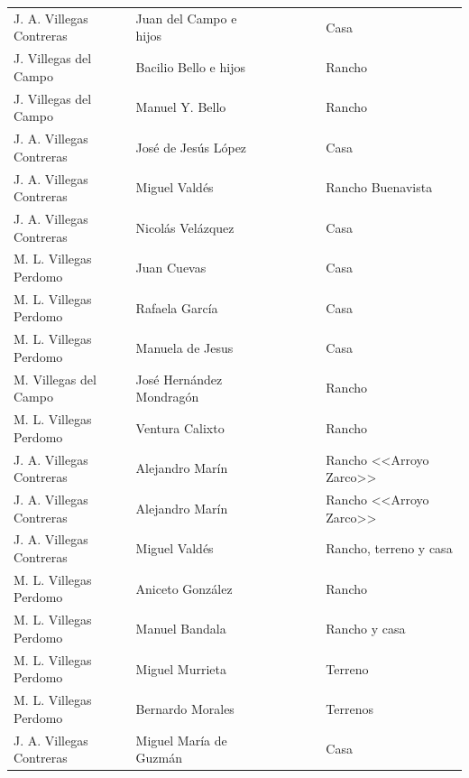 \documentclass[14pt,twoside,final]{extbook} %
\begin{document}
{\begin{longtable}[c]{@{}p{2.5cm}lrSrrl@{}}
J. A. Villegas Contreras & Juan del Campo e hijos &  &  &  &  & Casa \\
J. Villegas del Campo & Bacilio Bello e hijos &  &  & {} & {} & Rancho \\
J. Villegas del Campo & Manuel Y. Bello &  & {} & {} & {} & Rancho \\
J. A. Villegas Contreras & José de Jesús López &  & {} & {} & {} & Casa \\
J. A. Villegas Contreras & Miguel Valdés &  &  &  &  & Rancho Buenavista \\
J. A. Villegas Contreras & Nicolás Velázquez &  &  &  &  & Casa \\
M. L. Villegas Perdomo & Juan Cuevas &  & {} & {} & {} & Casa \\
M. L. Villegas Perdomo & Rafaela García &  & {} & {} & {} & Casa \\
M. L. Villegas Perdomo & Manuela de Jesus &  & {} & {} & {} & Casa \\
M. Villegas del Campo & José Hernández Mondragón &  & {} & {} & {} & Rancho \\
M. L. Villegas Perdomo & Ventura Calixto &  & {} & {} & {} & Rancho \\
J. A. Villegas Contreras & Alejandro Marín &  & {} &  &  & Rancho <<Arroyo Zarco>> \\
J. A. Villegas Contreras & Alejandro Marín &  &  &  &  & Rancho <<Arroyo Zarco>> \\
J. A. Villegas Contreras & Miguel Valdés &  & {} &  &  & Rancho, terreno y casa \\
M. L. Villegas Perdomo & Aniceto González &  &  & {} & {} & Rancho \\
M. L. Villegas Perdomo & Manuel Bandala &  & {} & {} & {} & Rancho y casa \\
M. L. Villegas Perdomo & Miguel Murrieta &  & {} & {} & {} & Terreno \\
M. L. Villegas Perdomo & Bernardo Morales &  & {} & {} & {} & Terrenos \\
J. A. Villegas Contreras & Miguel María de Guzmán &  &  &  &  & Casa \\

\end{longtable}}
\end{document}
